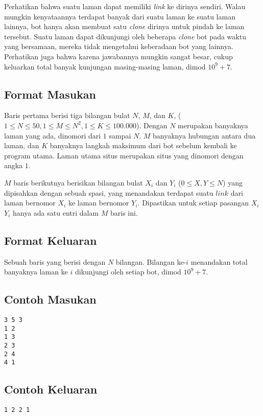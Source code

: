 \documentclass{article}
\begin{document}
Perhatikan bahwa suatu laman dapat memiliki \textit{link} ke dirinya sendiri. Walau mungkin kenyataannya terdapat banyak  dari suatu laman ke suatu laman lainnya, bot hanya akan membuat satu \textit{clone} dirinya untuk pindah ke laman tersebut. Suatu laman dapat dikunjungi oleh beberapa \textit{clone} bot pada waktu yang bersamaan, mereka tidak mengetahui keberadaan bot yang lainnya. Perhatikan juga bahwa karena jawabannya mungkin sangat besar, cukup keluarkan total banyak kunjungan masing-masing laman, dimod $10^9+7$.

\subsection*{Format Masukan}

Baris pertama berisi tiga bilangan bulat $N$, $M$, dan $K$, ($1 \leq N \leq 50, 1 \leq M \leq N^2, 1 \leq K \leq 100.000$). Dengan $N$ merupakan banyaknya laman yang ada, dinomori dari $1$ sampai $N$. $M$ banyaknya hubungan  antara dua laman, dan $K$ banyaknya langkah maksimum dari bot sebelum kembali ke program utama. Laman utama situs merupakan situs yang dinomori dengan angka $1$.

$M$ baris berikutnya berisikan bilangan bulat $X_i$ dan $Y_i$ ($0 \leq X,Y \leq N$) yang dipisahkan dengan sebuah spasi, yang menandakan terdapat suatu $\textit{link}$ dari laman bernomor $X_i$ ke laman bernomor $Y_i$. Dipastikan untuk setiap pasangan $X_i$ $Y_i$ hanya ada satu entri dalam $M$ baris ini.

\subsection*{Format Keluaran}

Sebuah baris yang berisi dengan $N$ bilangan. Bilangan ke-$i$ menandakan total banyaknya laman ke $i$ dikunjungi oleh setiap bot, dimod $10^9+7$.
\\

\begin{multicols}{2}
\subsection*{Contoh Masukan}
\begin{lstlisting}
3 5 3
1 2
1 3
2 3
2 4
4 1
\end{lstlisting}
\columnbreak
\subsection*{Contoh Keluaran}
\begin{lstlisting}
1 2 2 1
\end{lstlisting}
\vfill
\null
\end{multicols}
\end{document}

